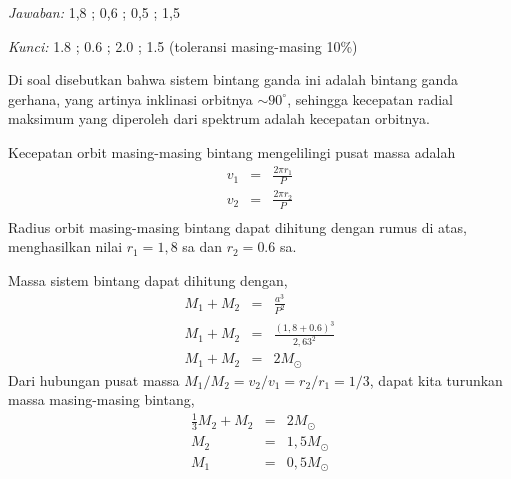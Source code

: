 \documentclass[11pt,fleqn]{exam}
\begin{document}
\begin{questions}
\bigskip
\textit{Jawaban: } 1,8 ; 0,6 ; 0,5 ; 1,5 

\textit{Kunci: } 1.8 ; 0.6 ; 2.0 ; 1.5 (toleransi masing-masing 10\%)

Di soal disebutkan bahwa sistem bintang ganda ini adalah bintang ganda gerhana, yang artinya inklinasi orbitnya $\sim 90^{\circ}$, sehingga kecepatan radial maksimum yang diperoleh dari spektrum adalah kecepatan orbitnya.

Kecepatan orbit masing-masing bintang mengelilingi pusat massa adalah
\begin{eqnarray*}
    v_1 &=& \frac{2 \pi r_1}{P}\\
    v_2 &=& \frac{2 \pi r_2}{P}\\
\end{eqnarray*}
Radius orbit masing-masing bintang dapat dihitung dengan rumus di atas, menghasilkan nilai $r_1 = 1,8$ sa dan $r_2 = 0.6$ sa.

Massa sistem bintang dapat dihitung dengan,
\begin{eqnarray*}
    M_1 + M_2 &=& \frac{a^3}{P^2}\\
    M_1 + M_2 &=& \frac{(1,8 + 0.6)^3}{2,63^2}\\
    M_1 + M_2 &=& 2 M_\odot
\end{eqnarray*}
Dari hubungan pusat massa $M_1/M_2 = v_2/v_1 = r_2 / r_1 = 1/3$, dapat kita turunkan massa masing-masing bintang,
\begin{eqnarray*}
    \frac{1}{3} M_2 + M_2 &=& 2 M_\odot\\
    M_2 &=& 1,5 M_\odot\\
    M_1 &=& 0,5 M_\odot
\end{eqnarray*}


\end{questions}
\end{document}
